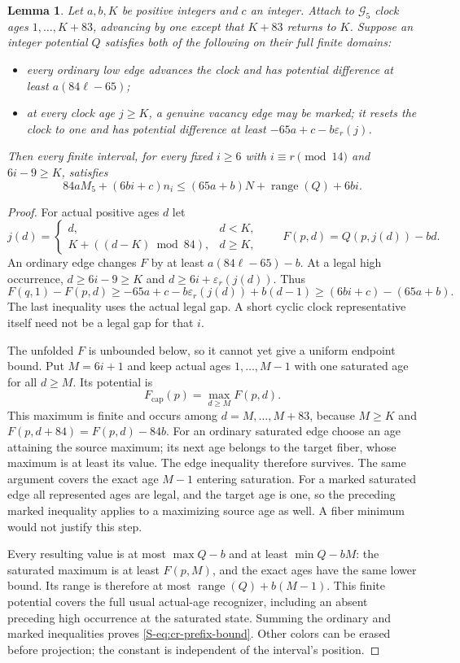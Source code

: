 \documentclass[11pt,reqno]{amsart}
\theoremstyle{plain}
\theoremstyle{plain}
\theoremstyle{plain}
\newtheorem{Slemma}[Stheorem]{Lemma}
\begin{document}
\begin{Slemma}\label{S-lem:cr-prefix-clock}
Let $a,b,K$ be positive integers and $c$ an integer. Attach
to $\mathcal G_5$ clock ages $1,\ldots,K+83$, advancing by one
except that $K+83$ returns to $K$. Suppose an integer potential $Q$
satisfies both of the following on their full finite domains:
\begin{itemize}
\item every ordinary low edge advances the clock and has potential
      difference at least $a(84\ell-65)$;
\item at every clock age $j\ge K$, a genuine vacancy edge may be
      marked; it resets the clock to one and has potential difference
      at least $-65a+c-b\varepsilon_r(j)$.
\end{itemize}
Then every finite interval, for every fixed $i\ge6$ with
$i\equiv r\pmod {14}$ and $6i-9\ge K$, satisfies
\begin{equation}\label{S-eq:cr-prefix-bound}
 84aM_5+(6bi+c)n_i\le(65a+b)N+\operatorname{range}(Q)+6bi.
\end{equation}
\end{Slemma}
\begin{proof}
For actual positive ages $d$ let
\[
 j(d)=\begin{cases}d,&d<K,\\K+((d-K)\bmod84),&d\ge K,
 \end{cases}
 \qquad F(p,d)=Q(p,j(d))-bd.
\]
An ordinary edge changes $F$ by at least $a(84\ell-65)-b$.
At a legal high occurrence, $d\ge6i-9\ge K$ and
$d\ge6i+\varepsilon_r(j(d))$. Thus
\[
 F(q,1)-F(p,d)\ge-65a+c-b\varepsilon_r(j(d))+b(d-1)
       \ge(6bi+c)-(65a+b).
\]
The last inequality uses the actual legal gap. A short cyclic
clock representative itself need not be a legal gap for that $i$.

The unfolded $F$ is unbounded below, so it cannot yet give a uniform
endpoint bound. Put $M=6i+1$ and keep actual ages $1,\ldots,M-1$
with one saturated age for all $d\ge M$. Its potential is
\[
 F_{\mathrm{cap}}(p)=\max_{d\ge M}F(p,d).
\]
This maximum is finite and occurs among $d=M,\ldots,M+83$, because
$M\ge K$ and $F(p,d+84)=F(p,d)-84b$. For an ordinary saturated
edge choose an age attaining the source maximum; its next age
belongs to the target fiber, whose maximum is at least its value.
The edge inequality therefore survives. The same argument covers
the exact age $M-1$ entering saturation. For a marked saturated
edge all represented ages are legal, and the target age is one,
so the preceding marked inequality applies to a maximizing source
age as well. A fiber minimum would not justify this step.

Every resulting value is at most $\max Q-b$ and at least
$\min Q-bM$: the saturated maximum is at least $F(p,M)$, and
the exact ages have the same lower bound. Its range is therefore
at most $\operatorname{range}(Q)+b(M-1)$. This finite potential
covers the full usual actual-age recognizer, including an absent
preceding high occurrence at the saturated state. Summing the
ordinary and marked inequalities proves \eqref{S-eq:cr-prefix-bound}.
Other colors can be erased before projection; the constant is
independent of the interval's position.
\end{proof}
\end{document}
